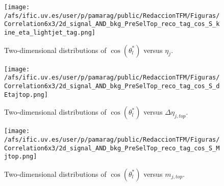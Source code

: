 \vspace*{5cm}

\begin{figure}[h]
\centering
\texttt{[image: /afs/ific.uv.es/user/p/pamarag/public/RedaccionTFM/Figuras/Correlation6x3/2d\_signal\_AND\_bkg\_PreSelTop\_reco\_tag\_cos\_S\_kine\_eta\_lightjet\_tag.png]}
\caption{Two-dimensional distributions of $\cos(\theta_l^{*})$ versus $\eta_j$.}
\end{figure}

\begin{figure}[h]
\centering
\texttt{[image: /afs/ific.uv.es/user/p/pamarag/public/RedaccionTFM/Figuras/Correlation6x3/2d\_signal\_AND\_bkg\_PreSelTop\_reco\_tag\_cos\_S\_dEtajtop.png]}
\caption{Two-dimensional distributions of $\cos(\theta_l^{*})$ versus $\Delta\eta_{j,top}$.}
\end{figure}

\begin{figure}[h]
\centering
\texttt{[image: /afs/ific.uv.es/user/p/pamarag/public/RedaccionTFM/Figuras/Correlation6x3/2d\_signal\_AND\_bkg\_PreSelTop\_reco\_tag\_cos\_S\_Mjtop.png]}
\caption{Two-dimensional distributions of $\cos(\theta_l^{*})$ versus $m_{j,top}$.}
\label{Fig:SB}
\end{figure}



\clearpage


